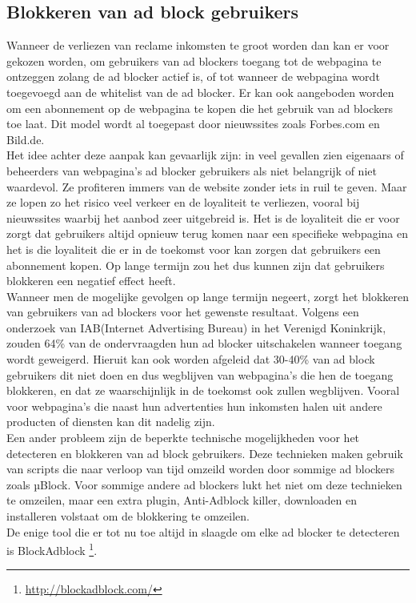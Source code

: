 \documentclass[pdftex,a4paper,12pt,twoside]{report}
\begin{document}
\subsection{Blokkeren van ad block gebruikers}
\label{sec Blokkeren van ad block gebruikers}
Wanneer de verliezen van reclame inkomsten te groot worden dan kan er voor gekozen worden, om gebruikers van ad blockers toegang tot de webpagina te ontzeggen zolang de ad blocker actief is, of tot wanneer de webpagina wordt toegevoegd aan de whitelist van de ad blocker. Er kan ook aangeboden worden om een abonnement op de webpagina te kopen die het gebruik van ad blockers toe laat. Dit model wordt al toegepast door nieuwssites zoals Forbes.com en Bild.de.
\\
Het idee achter deze aanpak kan gevaarlijk zijn: in veel gevallen zien eigenaars of beheerders van webpagina's ad blocker gebruikers als niet belangrijk of niet waardevol. Ze profiteren immers van de website zonder iets in ruil te geven. Maar ze lopen zo het risico veel verkeer en de loyaliteit te verliezen, vooral bij nieuwssites waarbij het aanbod zeer uitgebreid is. Het is de loyaliteit die er voor zorgt dat gebruikers altijd opnieuw terug komen naar een specifieke webpagina en het is die loyaliteit die er in de toekomst voor kan zorgen dat gebruikers een abonnement kopen. Op lange termijn zou het dus kunnen zijn dat gebruikers blokkeren een negatief effect heeft.
\\
Wanneer men de mogelijke gevolgen op lange termijn negeert, zorgt het blokkeren van gebruikers van ad blockers voor het gewenste resultaat. Volgens een onderzoek van IAB(Internet Advertising Bureau) in het Verenigd Koninkrijk, zouden 64\% van de ondervraagden hun ad blocker uitschakelen wanneer toegang wordt geweigerd. Hieruit kan ook worden afgeleid dat 30-40\% van ad block gebruikers dit niet doen en dus wegblijven van webpagina's die hen de toegang blokkeren, en dat ze waarschijnlijk in de toekomst ook zullen wegblijven. Vooral voor webpagina's die naast hun advertenties hun inkomsten halen uit andere producten of diensten kan dit nadelig zijn.
\\
Een ander probleem zijn de beperkte technische mogelijkheden voor het detecteren en blokkeren van ad block gebruikers. Deze technieken maken gebruik van scripts die naar verloop van tijd omzeild worden door sommige ad blockers zoals µBlock. Voor sommige andere ad blockers lukt het niet om deze technieken te omzeilen, maar een extra plugin, Anti-Adblock killer, downloaden en installeren volstaat om de blokkering te omzeilen.
\\
De enige tool die er tot nu toe altijd in slaagde om elke ad blocker te detecteren is BlockAdblock \footnote{\url{http://blockadblock.com/}}.
\end{document}
